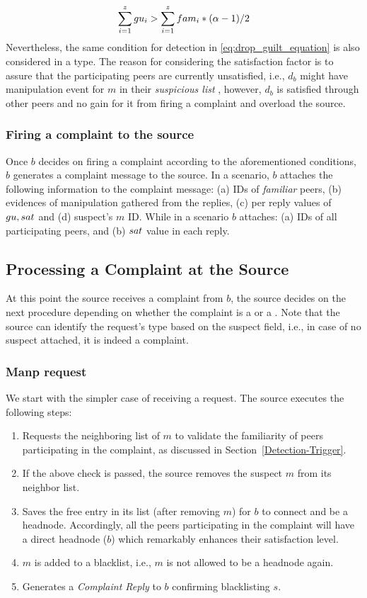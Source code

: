 \begin{align}
\label{eq:drop_guilt_equation}
\sum_{i=1}^{z} \guilt_i > \sum_{i=1}^{z} \fami_i*(\alpha-1)/2
\end{align}
Nevertheless, the same condition for \drop detection in \ref{eq:drop_guilt_equation} is also considered in a \block type.
The reason for considering the satisfaction factor is to assure that the participating peers are currently unsatisfied, i.e., $d_b$ might have manipulation event for $m$ in their \textit{suspicious list} , however, $d_b$ is satisfied through other peers and no gain for it from firing a complaint and overload the source.

\subsubsection*{Firing a complaint to the source}

Once $b$ decides on firing a complaint according to the aforementioned conditions, $b$ generates a complaint message to the source.
In a \block scenario, $b$ attaches the following information to the complaint message: (a) IDs of \textit{familiar} peers, (b) evidences of manipulation gathered from the replies, (c) per reply values of $gu,sat$ and (d) suspect's $m$ ID.
While in a \drop scenario $b$ attaches: (a) IDs of all participating peers, and (b) $sat$ value in each reply.

\subsection{Processing a Complaint at the Source}
\label{complaint_source}
At this point the source receives a complaint from $b$, the source decides on the next procedure depending on whether the complaint is a \drop or a \block.
Note that the source can identify the request's type based on the suspect field, i.e., in case of no suspect attached, it is indeed a \drop complaint.

\subsubsection*{Manp request}
We start with the simpler case of receiving a \block request. 
The source executes the following steps:
\begin{enumerate}
 \item Requests the neighboring list of $m$ to validate the familiarity of peers participating in the complaint, as discussed in Section~\ref{Detection-Trigger}.
 \item If the above check is passed, the source removes the suspect $m$ from its neighbor list.
 \item Saves the free entry in its list (after removing $m$) for $b$ to connect and be a headnode.
 Accordingly, all the peers participating in the complaint will have a direct headnode ($b$) which remarkably enhances their satisfaction level.
 \item $m$ is added to a blacklist, i.e., $m$ is not allowed to be a headnode again.
 \item Generates a \textit{Complaint Reply} to $b$ confirming blacklisting $s$.
\end{enumerate}

